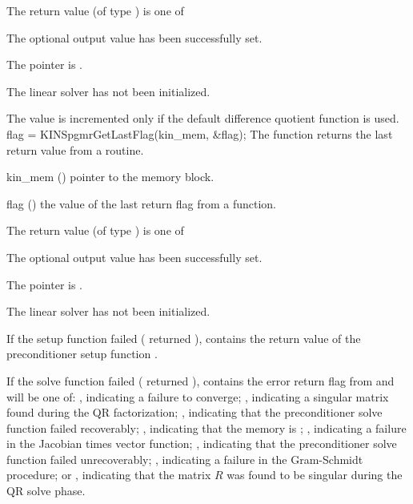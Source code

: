 {
  The return value  (of type ) is one of
  \begin{args}
  \item[\Id{KINSPGMR\_SUCCESS}] 
    The optional output value has been successfully set.
  \item[\Id{KINSPGMR\_MEM\_NULL}]
    The  pointer is .
  \item[\Id{KINSPGMR\_LMEM\_NULL}]
    The {\kinspgmr} linear solver has not been initialized.
  \end{args}
}
{
  The value  is incremented only if the default 
   difference quotient function is used.
}
{
  flag = KINSpgmrGetLastFlag(kin\_mem, \&flag);
}
{
  The function  returns the
  last return value from a {\kinspgmr} routine. 
}
{
  \begin{args}
  \item[kin\_mem] ()
    pointer to the {\kinsol} memory block.
  \item[flag] ()
    the value of the last return flag from a {\kinspgmr} function.
  \end{args}
}
{
  The return value  (of type ) is one of
  \begin{args}
  \item[\Id{KINSPGMR\_SUCCESS}] 
    The optional output value has been successfully set.
  \item[\Id{KINSPGMR\_MEM\_NULL}]
    The  pointer is .
  \item[\Id{KINSPGMR\_LMEM\_NULL}]
    The {\kinspgmr} linear solver has not been initialized.
  \end{args}
}
{
  If the {\kinspgmr} setup function failed ( returned
  ),  contains the return value of the
  preconditioner setup function .

  If the {\kinspgmr} solve function failed ( returned
  ),  contains the error return flag from
   and will be one of:
 , indicating a failure to converge;
 , indicating a singular matrix found during the QR
  factorization;
 , indicating that the preconditioner solve function
  failed recoverably;
  , indicating that the {\spgmr} memory is ;
  , indicating a failure in the Jacobian times vector
  function;
  , indicating that the preconditioner solve
  function  failed unrecoverably;
  , indicating a failure in the Gram-Schmidt procedure; 
  or , indicating that the matrix $R$ was found to be
  singular during the QR solve phase.
}

